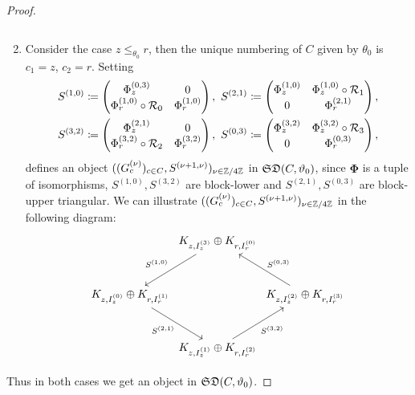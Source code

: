 \begin{proof}
\begin{enumerate}
\[        \]
    \item Consider the case $z \leq_{\theta_0} r$, then the unique numbering of $C$ given by $\theta_0$ is $c_1 = z$, $c_2 = r$. Setting 
        \begin{align*}
            S^{(1,0)} & \coloneqq 
        \begin{pmatrix}
            \Phi^{(0,3)}_z & 0\\
            \Phi_r^{(1,0)} \circ \mathcal{R}_0 & \Phi_r^{(1,0)}
        \end{pmatrix},~
        S^{(2,1)} \coloneqq 
        \begin{pmatrix}
            \Phi^{(1,0)}_z & \Phi^{(1,0)}_z \circ \mathcal{R}_1 \\
            0 & \Phi_r^{(2,1)}
        \end{pmatrix}, \\
         S^{(3,2)} & \coloneqq 
        \begin{pmatrix}
            \Phi^{(2,1)}_z & 0 \\
            \Phi_r^{(3,2)} \circ \mathcal{R}_2 & \Phi_r^{(3,2)}
        \end{pmatrix},~
        S^{(0,3)} \coloneqq 
        \begin{pmatrix}
            \Phi^{(3,2)}_z & \Phi_z^{(3,2)}\circ \mathcal{R}_3 \\
            0 & \Phi_r^{(0,3)}
        \end{pmatrix},
        \end{align*}
        defines an object $((G_c^{(\nu)})_{c \in C}, S^{(\nu+1,\nu)})_{\nu \in \mathbb{Z}/4\mathbb{Z}}$ in $\mathfrak{SD}(C,\vartheta_0)$, since $\bm{\Phi}$ is a tuple of isomorphisms, $S^{(1,0)},S^{(3,2)}$ are block-lower and $S^{(2,1)},S^{(0,3)}$ are block-upper triangular. We can illustrate $((G_c^{(\nu)})_{c \in C}, S^{(\nu+1,\nu)})_{\nu \in \mathbb{Z}/4\mathbb{Z}}$ in the following diagram:
        \[
         \begin{tikzcd}[row sep=1cm, column sep=0cm]
         & K_{z,I_z^{(3)}} \oplus K_{r,I_r^{(0)}} \arrow[dl, "S^{(1,0)}"'] & \\
        K_{z,I_z^{(0)}} \oplus K_{r,I_r^{(1)}} \arrow[dr, "S^{(2,1)}"'] & & K_{z,I_z^{(2)}} \oplus K_{r,I_r^{(3)}} \arrow[ul, "S^{(0,3)}" above right] \\
        & K_{z,I_z^{(1)}} \oplus K_{r,I_r^{(2)}}\arrow[ur, "S^{(3,2)}" below right] &
        \end{tikzcd}
        \]
\end{enumerate}
Thus in both cases we get an object in $\mathfrak{SD}(C,\vartheta_0)$.
\end{proof}

